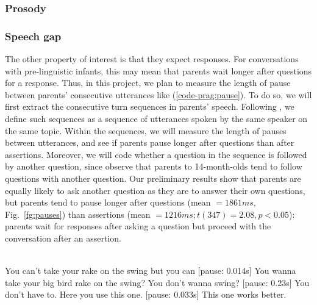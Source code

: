 \subsubsection{Prosody}
\label{sec:engsp:results:prosody}

\subsubsection{Speech gap}
\label{sec:engsp:results:pause}

The other property of interest is that they expect responses. For conversations with pre-linguistic infants, this may mean that parents wait longer after questions for a response. Thus, in this project, we plan to measure the length of pause between parents’ consecutive utterances like (\ref{code-prag:pause}). To do so, we will first extract the consecutive turn sequences in parents’ speech. Following \cite{reimchen2017}, we define such sequences as a sequence of utterances spoken by the same speaker on the same topic. Within the sequences, we will measure the length of pauses between utterances, and see if parents pause longer after questions than after assertions. Moreover, we will code whether a question in the sequence is followed by another question, since \cite{reimchen2017} observe that parents to 14-month-olds tend to follow questions with another question. Our preliminary results show that parents are equally likely to ask another question as they are to answer their own questions, but parents tend to pause longer after questions (mean $= 1861ms$, Fig.~\ref{fg:pauses}) than assertions (mean $= 1216ms; t(347) = 2.08, p <0.05$): parents wait for responses after asking a question but proceed with the conversation after an assertion. 




\\ 
\bxl
\ex You can’t take your rake on the swing but you can [pause: 0.014s] You wanna take your big bird rake on the swing? 			\hfill {}
\ex You don't wanna swing? [pause: 0.23s]	You don’t have to.	\hfill {}
\ex Here you use this one. [pause: 0.033s] This one works better.	\hfill {}
\exl
\eex




